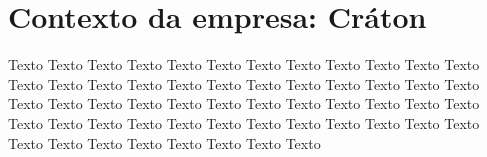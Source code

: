 \chapter{Contexto da empresa: Cráton}

  Texto Texto Texto Texto Texto Texto Texto Texto Texto Texto Texto Texto Texto Texto
  Texto Texto Texto Texto Texto Texto Texto Texto Texto Texto Texto Texto Texto Texto
  Texto Texto Texto Texto Texto Texto Texto Texto Texto Texto Texto Texto Texto Texto
  Texto Texto Texto Texto Texto Texto Texto Texto Texto Texto Texto Texto Texto Texto


